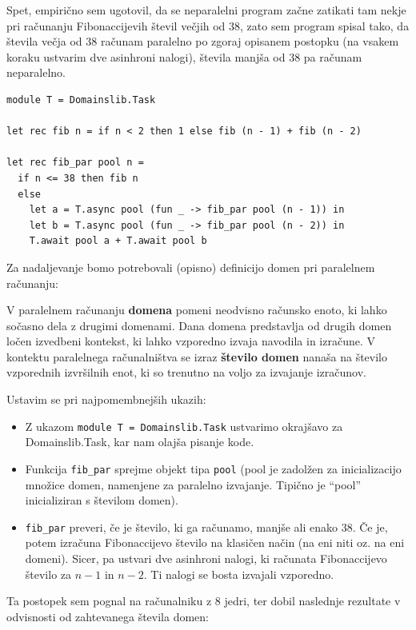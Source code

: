 \documentclass[mat1, tisk]{fmfdelo}
\begin{document}
Spet, empirično sem ugotovil, da se neparalelni program začne zatikati tam nekje pri računanju Fibonaccijevih števil večjih od 38, zato sem program spisal tako,
da števila večja od 38 računam paralelno po zgoraj opisanem postopku (na vsakem koraku ustvarim dve asinhroni nalogi), števila manjša od 38 pa računam neparalelno.

\begin{lstlisting}
module T = Domainslib.Task

let rec fib n = if n < 2 then 1 else fib (n - 1) + fib (n - 2)

let rec fib_par pool n =
  if n <= 38 then fib n
  else
    let a = T.async pool (fun _ -> fib_par pool (n - 1)) in
    let b = T.async pool (fun _ -> fib_par pool (n - 2)) in
    T.await pool a + T.await pool b
\end{lstlisting}



Za nadaljevanje bomo potrebovali (opisno) definicijo domen pri paralelnem računanju:
\begin{definicija}
  V paralelnem računanju \textbf{domena} pomeni neodvisno računsko enoto, ki lahko sočasno dela z drugimi domenami.
  Dana domena predstavlja od drugih domen ločen izvedbeni kontekst, ki lahko vzporedno izvaja navodila in izračune.
  V kontektu paralelnega računalništva se izraz \textbf{število domen} nanaša na število vzporednih izvršilnih enot, ki so 
  trenutno na voljo za izvajanje izračunov.
\end{definicija}

Ustavim se pri najpomembnejših ukazih:
\begin{itemize}
  \item Z ukazom \texttt{module T = Domainslib.Task} ustvarimo okrajšavo za Domainslib.Task, kar nam olajša pisanje kode.
  \item Funkcija \texttt{fib\_par} sprejme objekt tipa \texttt{pool} (pool je zadolžen za inicializacijo množice domen, namenjene za 
        paralelno izvajanje. Tipično je ``pool'' inicializiran s številom domen).
  \item \texttt{fib\_par} preveri, če je število, ki ga računamo, manjše ali enako 38. 
        Če je, potem izračuna Fibonaccijevo število na klasičen način (na eni niti oz. na eni domeni).
        Sicer, pa ustvari dve asinhroni nalogi, ki računata Fibonaccijevo število za $n-1$ in $n-2$. Ti nalogi se bosta izvajali vzporedno.
\end{itemize}

Ta postopek sem pognal na računalniku z 8 jedri, ter dobil naslednje rezultate v odvisnosti od zahtevanega števila domen:
\end{document}
